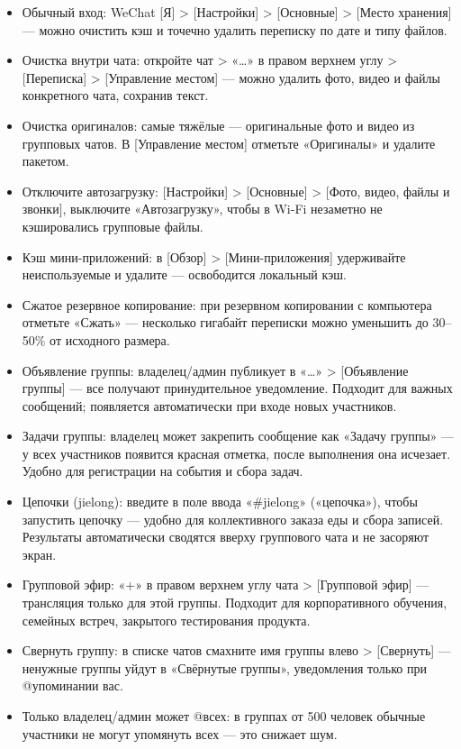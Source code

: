\begin{itemize}
  \item Обычный вход: WeChat [Я] > [Настройки] > [Основные] > [Место хранения] — можно очистить кэш и точечно удалить переписку по дате и типу файлов.
  \item Очистка внутри чата: откройте чат > «…» в правом верхнем углу > [Переписка] > [Управление местом] — можно удалить фото, видео и файлы конкретного чата, сохранив текст.
  \item Очистка оригиналов: самые тяжёлые — оригинальные фото и видео из групповых чатов. В [Управление местом] отметьте «Оригиналы» и удалите пакетом.
  \item Отключите автозагрузку: [Настройки] > [Основные] > [Фото, видео, файлы и звонки], выключите «Автозагрузку», чтобы в Wi-Fi незаметно не кэшировались групповые файлы.
  \item Кэш мини-приложений: в [Обзор] > [Мини-приложения] удерживайте неиспользуемые и удалите — освободится локальный кэш.
  \item Сжатое резервное копирование: при резервном копировании с компьютера отметьте «Сжать» — несколько гигабайт переписки можно уменьшить до 30–50\% от исходного размера.
\end{itemize}


\begin{itemize}
  \item Объявление группы: владелец/админ публикует в «…» > [Объявление группы] — все получают принудительное уведомление. Подходит для важных сообщений; появляется автоматически при входе новых участников.
  \item Задачи группы: владелец может закрепить сообщение как «Задачу группы» — у всех участников появится красная отметка, после выполнения она исчезает. Удобно для регистрации на события и сбора задач.
  \item Цепочки (jielong): введите в поле ввода «\#jielong» («цепочка»), чтобы запустить цепочку — удобно для коллективного заказа еды и сбора записей. Результаты автоматически сводятся вверху группового чата и не засоряют экран.
  \item Групповой эфир: «+» в правом верхнем углу чата > [Групповой эфир] — трансляция только для этой группы. Подходит для корпоративного обучения, семейных встреч, закрытого тестирования продукта.
  \item Свернуть группу: в списке чатов смахните имя группы влево > [Свернуть] — ненужные группы уйдут в «Свёрнутые группы», уведомления только при @упоминании вас.
  \item Только владелец/админ может @всех: в группах от 500 человек обычные участники не могут упомянуть всех — это снижает шум.
\end{itemize}

